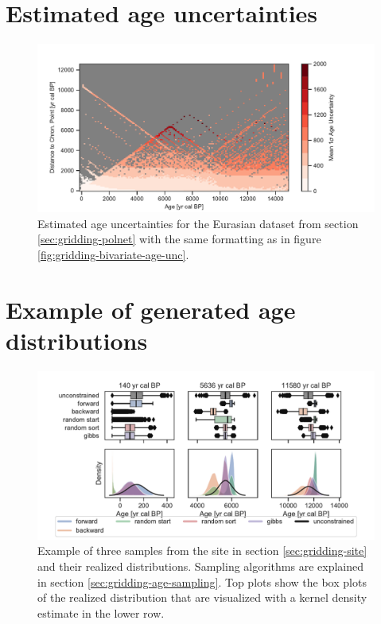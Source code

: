 \begin{refsection}
\begin{subappendices}
	\section{Estimated age uncertainties}  \label{sec:gridding-suppl-age-uncertainties}	
		\begin{figure}[!h]
			\includegraphics[width=\linewidth]{gridding-figures/realized-age-uncertainties.pdf}
			\caption[Estimated age uncertainties]{Estimated age uncertainties for the Eurasian dataset from section \ref{sec:gridding-polnet} with the same formatting as in figure \ref{fig:gridding-bivariate-age-unc}.}
			\label{fig:gridding-age-uncertainties}
		\end{figure}

	\section{Example of generated age distributions} \label{sec:gridding-suppl-age-example-distributions}
		\begin{figure}[!h]
			\includegraphics[width=\linewidth]{gridding-figures/age-sampling-methods-use-case.pdf}
			\caption[Example of sampled distribution]{Example of three samples from the site in section \ref{sec:gridding-site} and their realized distributions. Sampling algorithms are explained in section \ref{sec:gridding-age-sampling}. Top plots show the box plots of the realized distribution that are visualized with a kernel density estimate in the lower row.}
			\label{fig:gridding-age-example-distributions}
		\end{figure}
	

\end{subappendices}
\end{refsection}

